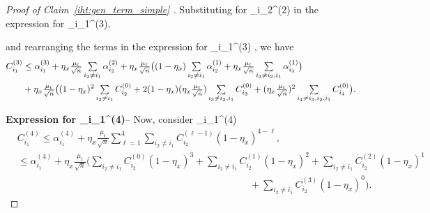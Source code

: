 \documentclass{article}
\def\[#1\]{{$#1$}}
\begin{document}
\begin{proof}[Proof of Claim~\ref{iht:gen_term_simple} ]
	Substituting for \[C_{i_2}^{(2)}\] in the expression for \[C_{i_1}^{(3)}\],










	and rearranging the terms in the expression for \[C_{i_1}^{(3)} \], we have
	\begin{align}\label{eq:C_i_3}
	C_{i_1}^{(3)} 
	&\leq \alpha^{(3)}_{i_1} + \eta_x\tfrac{\mu_t}{\sqrt{n}} \textstyle\sum\limits_{i_2 \neq i_1}\alpha^{(2)}_{i_2} +\eta_x\tfrac{\mu_t}{\sqrt{n}}\big( (1-\eta_x) \textstyle\sum\limits_{i_2 \neq i_1}\alpha^{(1)}_{i_2} + \eta_x\tfrac{\mu_t}{\sqrt{n}} \textstyle\sum\limits_{i_3 \neq i_2, i_1} \alpha^{(1)}_{i_3}\big) \notag \\
	&
	+  \eta_x\tfrac{\mu_t}{\sqrt{n}}\big((1-\eta_x)^{2} \textstyle\sum\limits_{i_2 \neq i_1}C_{i_2}^{(0)} +  2(1-\eta_x)(\eta_x\tfrac{\mu_t}{\sqrt{n}})\textstyle\sum\limits_{i_3 \neq i_2, i_1} C_{i_3}^{(0)} +  (\eta_x\tfrac{\mu_t}{\sqrt{n}})^2\textstyle\sum\limits_{i_4 \neq i_3, i_2, i_1} C_{i_4}^{(0)}\big).
	\end{align}
	
	\noindent\textbf{Expression for \[C_{i_1}^{(4)}\]}--	Now, consider \[C_{i_1}^{(4)}\]
	\begin{align*}
	&C_{i_1}^{(4)} 
	\leq \alpha^{(4)}_{i_1}  + \eta_x\tfrac{\mu_t}{\sqrt{n}}\textstyle\sum_{\ell=1}^{4}\textstyle\sum_{i_2 \neq i_1} C_{i_2}^{(\ell -1)}(1-\eta_x)^{4 - \ell},\\
	
	&\leq \alpha^{(4)}_{i_1}  + \eta_x\tfrac{\mu_t}{\sqrt{n}}\big(\textstyle\sum_{i_2 \neq i_1} C_{i_2}^{(0)}(1-\eta_x)^{3} + \textstyle\sum_{i_2 \neq i_1} C_{i_2}^{(1)}(1-\eta_x)^{2} + \textstyle\sum_{i_2 \neq i_1} C_{i_2}^{(2)}(1-\eta_x)^{1} \\&\hspace{10cm}+ \textstyle\sum_{i_2 \neq i_1} C_{i_2}^{(3)}(1-\eta_x)^{0}\big).
	\end{align*}
	
	










































\end{proof}
\end{document}
